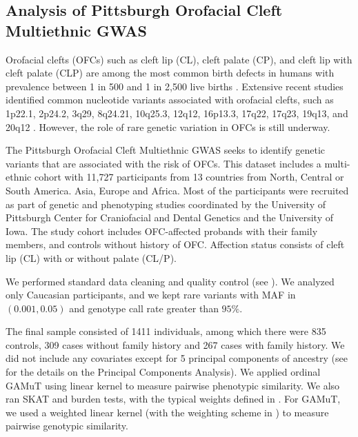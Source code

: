 \documentclass[]{article}
\theoremstyle{definition}
\theoremstyle{definition}
\theoremstyle{definition}
\theoremstyle{remark}
\begin{document}
\hypertarget{analysis-of-pittsburgh-orofacial-cleft-multiethnic-gwas}{%
\subsection{Analysis of Pittsburgh Orofacial Cleft Multiethnic
GWAS}\label{analysis-of-pittsburgh-orofacial-cleft-multiethnic-gwas}}

Orofacial clefts (OFCs) such as cleft lip (CL), cleft palate (CP), and
cleft lip with cleft palate (CLP) are among the most common birth
defects in humans with prevalence between 1 in 500 and 1 in 2,500 live
births \citep{Tessier1976, Mossey2009}. Extensive recent studies
identified common nucleotide variants associated with orofacial clefts,
such as 1p22.1, 2p24.2, 3q29, 8q24.21, 10q25.3, 12q12, 16p13.3, 17q22,
17q23, 19q13, and 20q12
\citep{Birnbaum2009, Grant2009, Beaty2010, Mangold2009, Wolf2015, Leslie2016, Leslie2016b, Mostowska2018}.
However, the role of rare genetic variation in OFCs is still underway.

The Pittsburgh Orofacial Cleft Multiethnic GWAS
\citep{Leslie2016, Leslie2016b} seeks to identify genetic variants that
are associated with the risk of OFCs. This dataset includes a
multi-ethnic cohort with 11,727 participants from 13 countries from
North, Central or South America. Asia, Europe and Africa. Most of the
participants were recruited as part of genetic and phenotyping studies
coordinated by the University of Pittsburgh Center for Craniofacial and
Dental Genetics and the University of Iowa. The study cohort includes
OFC-affected probands with their family members, and controls without
history of OFC. Affection status consists of cleft lip (CL) with or
without palate (CL/P).

We performed standard data cleaning and quality control (see
\citet{Leslie2016}). We analyzed only Caucasian participants, and we
kept rare variants with MAF in \((0.001,0.05)\) and genotype call rate
greater than \(95\%\).

The final sample consisted of 1411 individuals, among which there were
835 controls, 309 cases without family history and 267 cases with family
history. We did not include any covariates except for 5 principal
components of ancestry (see \citet{Leslie2016} for the details on the
Principal Components Analysis). We applied ordinal GAMuT using linear
kernel to measure pairwise phenotypic similarity. We also ran SKAT and
burden tests, with the typical weights defined in \citet{Wu2011}. For
GAMuT, we used a weighted linear kernel (with the weighting scheme in
\citet{Wu2011}) to measure pairwise genotypic similarity.
\end{document}
